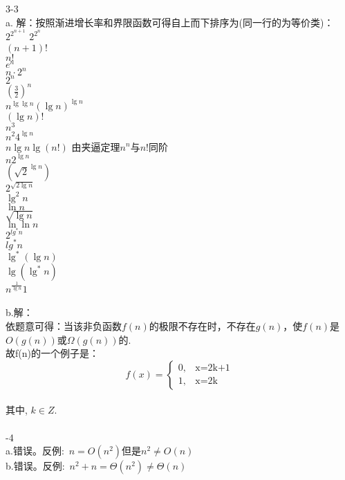 \documentclass[19pt]{article}
\begin{document}
3-3\\
\indent a. 解：按照渐进增长率和界限函数可得自上而下排序为(同一行的为等价类)：\\
\indent $2^{2^{n+1}}$ \quad $2^{2^n}$\\
\indent $(n+1)!$\\
\indent $n!$\\
\indent $e^n$\\
\indent $n\cdot2^n$\\
\indent $2^n$\\
\indent $(\frac{3}{2})^n$\\
\indent $n^{\lg \lg n}$\quad $(\lg n)^{\lg n}$\\
\indent $(\lg n)!$\\
\indent $n^3$\\
\indent $n^2$\quad$4^{\lg n}$\\
\indent $n\lg n$\quad $\lg (n!)$ 由夹逼定理$n^n$与$n!$同阶\\
\indent $n$\quad$2^{\lg n}$\\
\indent $(\sqrt{2}^{\lg n})$\\
\indent $2^{\sqrt{2\lg n}}$\\
\indent $\lg ^2n$\\
\indent $\ln n$\\
\indent $\sqrt {\lg n}$\\
\indent $\ln \ln n$\\
\indent $2^{lg^*n}$\\
\indent $lg^*n$\\
\indent $\lg ^*(\lg n)$\\
\indent $\lg (\lg ^*n)$\\
\indent $n^{\frac{1}{\lg n}}$\quad$1$\\
\\
\indent b.解：\\
\indent 依题意可得：当该非负函数$f(n)$的极限不存在时，不存在$g(n)$，使$f(n)$是$O(g(n))$或$\Omega(g(n))$的.\\
\indent 故f(n)的一个例子是：\\
\indent $$f(x)=\begin{cases}0,&\text{x=2k+1}\\1,&\text{x=2k}\end{cases}$$\\
\indent 其中, $k\in Z$.\\
\\
-4\\
\indent a.错误。反例:\ $n=O(n^2)$但是$n^2\ne O(n)$\\
\indent b.错误。反例:\ $n^2+n=\Theta(n^2)\ne \Theta(n)$\\
\end{document}
